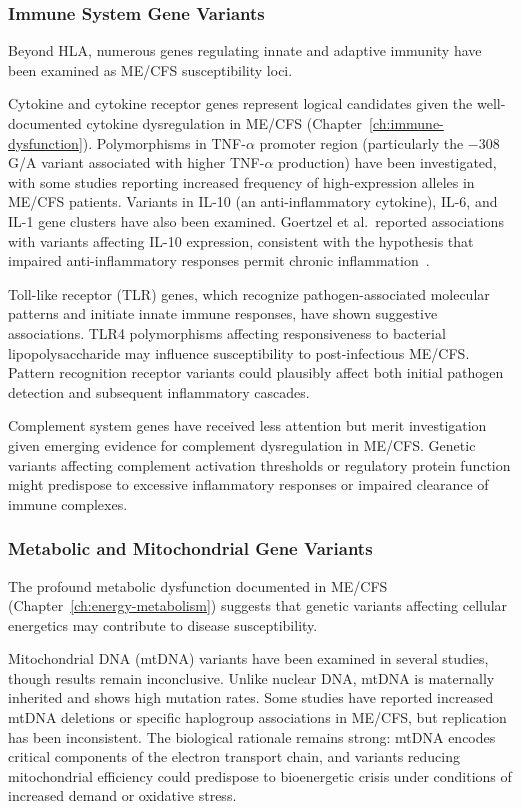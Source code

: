 \subsubsection{Immune System Gene Variants}

Beyond HLA, numerous genes regulating innate and adaptive immunity have been examined as ME/CFS susceptibility loci.

Cytokine and cytokine receptor genes represent logical candidates given the well-documented cytokine dysregulation in ME/CFS (Chapter~\ref{ch:immune-dysfunction}). Polymorphisms in TNF-$\alpha$ promoter region (particularly the $-308$ G/A variant associated with higher TNF-$\alpha$ production) have been investigated, with some studies reporting increased frequency of high-expression alleles in ME/CFS patients. Variants in IL-10 (an anti-inflammatory cytokine), IL-6, and IL-1 gene clusters have also been examined. Goertzel et al.\ reported associations with variants affecting IL-10 expression, consistent with the hypothesis that impaired anti-inflammatory responses permit chronic inflammation~\cite{Goertzel2006}.

Toll-like receptor (TLR) genes, which recognize pathogen-associated molecular patterns and initiate innate immune responses, have shown suggestive associations. TLR4 polymorphisms affecting responsiveness to bacterial lipopolysaccharide may influence susceptibility to post-infectious ME/CFS. Pattern recognition receptor variants could plausibly affect both initial pathogen detection and subsequent inflammatory cascades.

Complement system genes have received less attention but merit investigation given emerging evidence for complement dysregulation in ME/CFS. Genetic variants affecting complement activation thresholds or regulatory protein function might predispose to excessive inflammatory responses or impaired clearance of immune complexes.

\subsubsection{Metabolic and Mitochondrial Gene Variants}

The profound metabolic dysfunction documented in ME/CFS (Chapter~\ref{ch:energy-metabolism}) suggests that genetic variants affecting cellular energetics may contribute to disease susceptibility.

Mitochondrial DNA (mtDNA) variants have been examined in several studies, though results remain inconclusive. Unlike nuclear DNA, mtDNA is maternally inherited and shows high mutation rates. Some studies have reported increased mtDNA deletions or specific haplogroup associations in ME/CFS, but replication has been inconsistent. The biological rationale remains strong: mtDNA encodes critical components of the electron transport chain, and variants reducing mitochondrial efficiency could predispose to bioenergetic crisis under conditions of increased demand or oxidative stress.

